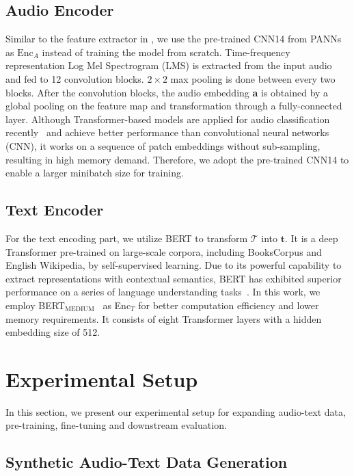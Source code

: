\documentclass[sigconf]{acmart}
\begin{document}
\subsection{Audio Encoder}
Similar to the feature extractor in , we use the pre-trained CNN14 from PANNs~\citep{kong2020panns} as $\text{Enc}_A$ instead of training the model from scratch.
Time-frequency representation Log Mel Spectrogram (LMS) is extracted from the input audio and fed to 12 convolution blocks.
$2\times2$ max pooling is done between every two blocks.
After the convolution blocks, the audio embedding \textbf{a} is obtained by a global pooling on the feature map and transformation through a fully-connected layer. 
Although Transformer-based models are applied for audio classification recently~\cite{gong2021audio} and achieve better performance than convolutional neural networks (CNN), it works on a sequence of patch embeddings without sub-sampling, resulting in high memory demand.
Therefore, we adopt the pre-trained CNN14 to enable a larger minibatch size for training.

\subsection{Text Encoder}
For the text encoding part, we utilize BERT to transform $\mathcal{T}$ into $\mathbf{t}$.
It is a deep Transformer pre-trained on large-scale corpora, including BooksCorpus and English Wikipedia, by self-supervised learning.
Due to its powerful capability to extract representations with contextual semantics, BERT has exhibited superior performance on a series of language understanding tasks~\cite{devlin2019bert}.
In this work, we employ BERT$_\text{MEDIUM}$~\cite{turc2019well} as Enc$_T$ for better computation efficiency and lower memory requirements.
It consists of eight Transformer layers with a hidden embedding size of 512.

\section{Experimental Setup}
In this section, we present our experimental setup for expanding audio-text data, pre-training, fine-tuning and downstream evaluation.

\subsection{Synthetic Audio-Text Data Generation}
\label{subsec:syn_data_generation_setup}
\end{document}
